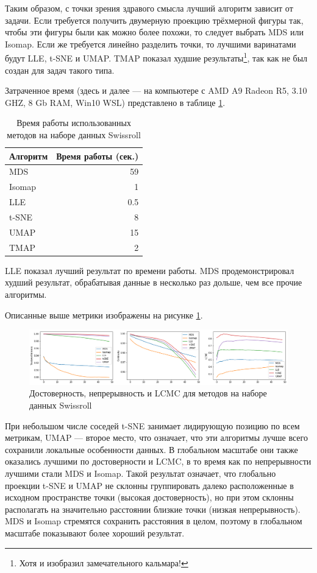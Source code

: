 \documentclass[10pt, a4paper]{extarticle}
\begin{document}
Таким образом, с точки зрения здравого смысла лучший алгоритм зависит от задачи. Если требуется получить двумерную проекцию трёхмерной фигуры так, чтобы эти фигуры были как можно более похожи, то следует выбрать MDS или Isomap. Если же требуется линейно разделить точки, то лучшими варинатами будут LLE, t-SNE и UMAP. TMAP показал худшие результаты\footnote{Хотя и изобразил замечательного кальмара!}, так как не был создан для задач такого типа.

Затраченное время (здесь и далее — на компьютере с AMD A9 Radeon R5, 3.10 GHZ, 8 Gb RAM, Win10 WSL) представлено в таблице \ref{tab:swissroll_time}.

\begin{table}[h!]
    \centering
    \begin{tabular}{l r}
        \toprule
         Алгоритм & Время работы (сек.)  \\
         \midrule
         MDS & 59 \\
         Isomap & 1 \\
         LLE & 0.5 \\
         t-SNE & 8 \\
         UMAP & 15 \\
         TMAP & 2 \\
         \bottomrule
    \end{tabular}
    \caption{Время работы использованных методов на наборе данных Swissroll}
    \label{tab:swissroll_time}
\end{table}

LLE показал лучший результат по времени работы. MDS продемонстрировал худший результат, обрабатывая данные в несколько раз дольше, чем все прочие алгоритмы. 

Описанные выше метрики изображены на рисунке \ref{fig:metrics_swissroll}.
\begin{figure}[h!]
    \centering
    \includegraphics[width=\linewidth]{swissroll_metrics.png}
    \caption{Достоверность, непрерывность и LCMC для методов на наборе данных Swissroll}
    \label{fig:metrics_swissroll}
\end{figure}

При небольшом числе соседей t-SNE занимает лидирующую позицию по всем метрикам, UMAP — второе место, что означает, что эти алгоритмы лучше всего сохранили локальные особенности данных. В глобальном масштабе они также оказались лучшими по достоверности и LCMC, в то время как по непрерывности лучшими стали MDS и Isomap. Такой результат означает, что глобально проекции t-SNE и UMAP не склонны группировать далеко расположенные в исходном пространстве точки (высокая достоверность), но при этом склонны располагать на значительно расстоянии близкие точки (низкая непрерывность). MDS и Isomap стремятся сохранить расстояния в целом, поэтому в глобальном масштабе показывают более хороший результат. 
\end{document}
